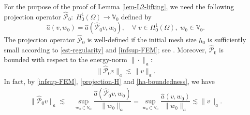 \documentclass[preprint,times]{elsarticle}%
\numberwithin{algorithm}{section}
\numberwithin{equation}{section}
\newcommand{\anorm}[1]{\|#1\|_a}
\newcommand{\ha}{\hat{a}}
\newcommand{\hmcP}{\hat{\mathcal{P}}}
\newcommand{\mbV}{\mathbb{V}}
\begin{document}
For the purpose of the proof of Lemma \ref{lem-L2-lifting}, we need the following projection operator $\hmcP_0: \; H_0^1(\Omega) \rightarrow \mbV_0$ defined by 
\begin{equation}\label{projection-H}
	\ha(v,w_0) = \ha(\hmcP_0 v,w_0), \quad \forall \; v \in H_0^1(\Omega),\; w_0 \in \mbV_0. 
\end{equation} 
The projection operator $\hmcP_0$ is well-defined if the initial mesh size $h_0$ is sufficiently small according to \eqref{est-regularity} and \eqref{infsup-FEM}; see \cite[Lemma 2.3]{XuJC96:1759}. Moreover, $\hmcP_0$ is bounded with respect to the energy-norm $\anorm{\cdot}$: 
	\begin{equation}\label{projection-H-bound}
		\anorm{\hmcP_0 v} \lesssim \anorm{v}.
	\end{equation}
In fact, by \eqref{infsup-FEM}, \eqref{projection-H} and \eqref{ha-boundedness}, we have 
	\begin{align}
		\anorm{\hmcP_0 v} \lesssim~& \sup_{w_0 \in \mbV_0} \dfrac{\ha(\hmcP_0 v,w_0)}{\anorm{w_0}} = \sup_{w_0 \in \mbV_0} \dfrac{\ha(v,w_0)}{\anorm{w_0}} \lesssim \anorm{v}. 
	\end{align}
\end{document}
